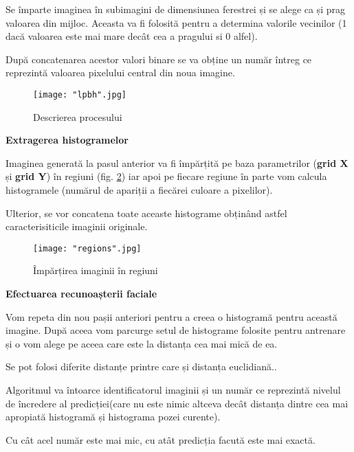 \documentclass[a4paper, 12pt]{article}
\begin{document}
\begin{outline}[enumerate]
		\quad Se împarte imaginea în subimagini de dimensiunea ferestrei și se alege ca și prag valoarea din mijloc. Aceasta va fi folosită pentru a determina valorile vecinilor (1 dacă valoarea este mai mare decât cea a pragului si 0 alfel). 
		
		\quad După concatenarea acestor valori binare se va obține un număr întreg ce reprezintă valoarea pixelului central din noua imagine. \textbf{\cite{salton_prado_salton_prado_2017}}
		\begin{figure}[!htb]
			\centering
			\texttt{[image: "lpbh".jpg]}
			\caption{Descrierea procesului \textbf{\cite{salton_prado_salton_prado_2017}}}\label{fig:lbph}
		\end{figure}
		\1 \textbf{Extragerea histogramelor} 
		
		\quad Imaginea generată la pasul anterior va fi împărțită pe baza parametrilor (\textbf{grid X} și \textbf{grid Y}) în regiuni (fig. \ref{fig:regions}) iar apoi pe fiecare regiune în parte vom calcula histogramele (numărul de apariții a fiecărei culoare a pixelilor).
		
		\quad Ulterior, se vor concatena toate aceaste histograme obținând astfel caracterisiticile imaginii originale.\textbf{\cite{salton_prado_salton_prado_2017}}
		\begin{figure}[!htb]
			\centering
			\texttt{[image: "regions".jpg]}
			\caption{Împărțirea imaginii în regiuni \textbf{\cite{salton_prado_salton_prado_2017}}}\label{fig:regions}
		\end{figure}
		
		\1 \textbf{Efectuarea recunoașterii faciale} 
		
		\quad Vom repeta din nou pașii anteriori pentru a creea o histogramă pentru această imagine. După aceea vom parcurge setul de histograme folosite pentru antrenare și o vom alege pe aceea care este la distanța cea mai mică de ea.
		
		\quad Se pot folosi diferite distanțe printre care și distanța euclidiană.\textbf{\cite{salton_prado_salton_prado_2017}}. 
		
		\quad Algoritmul va întoarce identificatorul imaginii și un număr ce reprezintă nivelul de încredere al predicției(care nu este nimic altceva decât distanța dintre cea mai apropiată histogramă și histograma pozei curente). 
		
		\quad Cu cât acel număr este mai mic, cu atât predicția facută este mai exactă.
		
	\end{outline}
	
\end{document}
